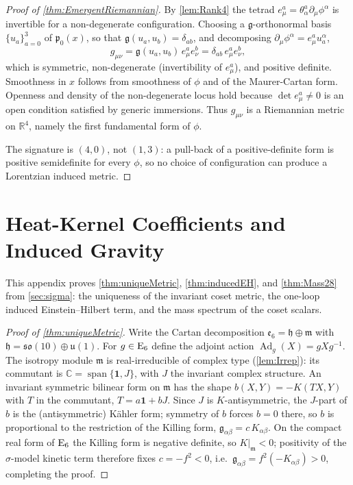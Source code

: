 \documentclass[pdflatex,sn-mathphys-num]{sn-jnl}
\theoremstyle{thmstyleone}
\theoremstyle{thmstylethree}%
\theoremstyle{thmstyletwo}%
\begin{document}
\begin{appendices}
\begin{proof}[Proof of \autoref{thm:EmergentRiemannian}]
By \autoref{lem:Rank4} the tetrad
\(e_\mu^{a}=\theta^{a}_{\alpha}\partial_\mu\phi^{\alpha}\) is
invertible for a non-degenerate configuration. Choosing a
\(\mathfrak g\)-orthonormal basis \(\{u_a\}_{a=0}^{3}\) of
\(\mathfrak p_{0}(x)\), so that \(\mathfrak g(u_a,u_b)=\delta_{ab}\), and
decomposing \(\partial_\mu\phi^{\alpha}=e_\mu^{a}u_a^{\alpha}\),
\[
  g_{\mu\nu}
  =\mathfrak g(u_a,u_b)\,e_\mu^{a}e_\nu^{b}
  =\delta_{ab}\,e_\mu^{a}e_\nu^{b},
\]
which is symmetric, non-degenerate (invertibility of \(e_\mu^{a}\)), and
positive definite. Smoothness in \(x\) follows from smoothness of \(\phi\) and
of the Maurer-Cartan form. Openness and density of the non-degenerate locus
hold because \(\det e_\mu^{a}\neq0\) is an open condition satisfied by
generic immersions. Thus \(g_{\mu\nu}\) is a Riemannian metric on
\(\mathbb R^{4}\), namely the first fundamental form of \(\phi\).

The signature is \((4,0)\), not \((1,3)\): a pull-back of a positive-definite
form is positive semidefinite for every \(\phi\), so no choice of configuration
can produce a Lorentzian induced metric.
\end{proof}

\section{Heat-Kernel Coefficients and Induced Gravity}
\label{app:Gravity}

This appendix proves \autoref{thm:uniqueMetric}, \autoref{thm:inducedEH}, and
\autoref{thm:Mass28} from \autoref{sec:sigma}: the uniqueness of the invariant
coset metric, the one-loop induced Einstein--Hilbert term, and the mass
spectrum of the coset scalars.

\begin{proof}[Proof of \autoref{thm:uniqueMetric}]
Write the Cartan decomposition $\mathfrak e_{6}=\mathfrak h\oplus\mathfrak m$
with $\mathfrak h=\mathfrak{so}(10)\oplus\mathfrak u(1)$.  For $g\in \mathrm{E}_{6}$
define the adjoint action $\operatorname{Ad}_{g}(X)=gXg^{-1}$. The isotropy
module $\mathfrak m$ is real-irreducible of complex type
(\autoref{lem:Irrep}): its commutant is
$\mathbb C=\operatorname{span}\{\mathbf 1,J\}$, with $J$ the invariant complex
structure. An invariant symmetric bilinear form on $\mathfrak m$ has the shape
$b(X,Y)=-K(TX,Y)$ with $T$ in the commutant, $T=a\mathbf 1+bJ$. Since $J$ is
$K$-antisymmetric, the $J$-part of $b$ is the (antisymmetric) K\"ahler form;
symmetry of $b$ forces $b=0$ there, so $b$ is proportional to the restriction
of the Killing form,
\(
  \mathfrak g_{\alpha\beta}=c\,K_{\alpha\beta}.
\)
On the compact real form of $\mathrm{E}_{6}$ the Killing form is negative definite, so
$K|_{\mathfrak m}<0$; positivity of the $\sigma$-model kinetic term therefore
fixes $c=-f^{2}<0$, i.e.\ $\mathfrak g_{\alpha\beta}=f^{2}(-K_{\alpha\beta})>0$,
completing the proof.
\end{proof}


\end{appendices}
\end{document}
